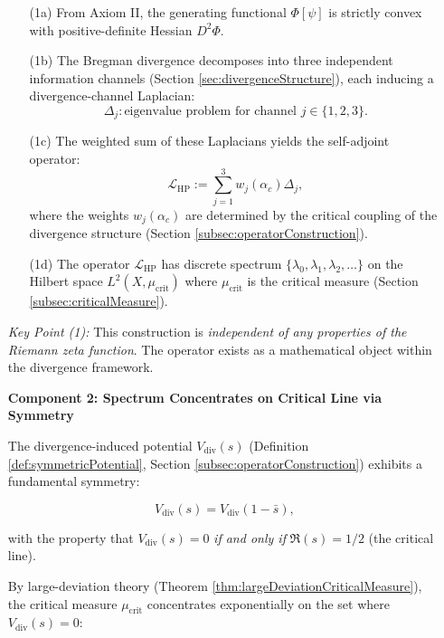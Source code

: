 \begin{theorem}
\begin{enumerate}
\begin{enumerate}
\item[(1a)] From Axiom II, the generating functional $\Phi[\psi]$ is strictly convex with positive-definite Hessian $D^2\Phi$.

\item[(1b)] The Bregman divergence decomposes into three independent information channels (Section \ref{sec:divergenceStructure}), each inducing a divergence-channel Laplacian:
\begin{equation}
\Delta_j : \text{eigenvalue problem for channel } j \in \{1,2,3\}.
\end{equation}

\item[(1c)] The weighted sum of these Laplacians yields the self-adjoint operator:
\begin{equation}
\mathcal{L}_{\mathrm{HP}} := \sum_{j=1}^{3} w_j(\alpha_c) \Delta_j,
\end{equation}
where the weights $w_j(\alpha_c)$ are determined by the critical coupling of the divergence structure (Section \ref{subsec:operatorConstruction}).

\item[(1d)] The operator $\mathcal{L}_{\mathrm{HP}}$ has discrete spectrum $\{\lambda_0, \lambda_1, \lambda_2, \ldots\}$ on the Hilbert space $L^2(X, \mu_{\mathrm{crit}})$ where $\mu_{\mathrm{crit}}$ is the critical measure (Section \ref{subsec:criticalMeasure}).

\end{enumerate}

\textit{Key Point (1):} This construction is \emph{independent of any properties of the Riemann zeta function}. The operator exists as a mathematical object within the divergence framework.

\item[\textbf{Component 2: Spectrum Concentrates on Critical Line via Symmetry}]

The divergence-induced potential $V_{\mathrm{div}}(s)$ (Definition \ref{def:symmetricPotential}, Section \ref{subsec:operatorConstruction}) exhibits a fundamental symmetry:

\begin{equation}
V_{\mathrm{div}}(s) = V_{\mathrm{div}}(1-\bar{s}),
\end{equation}

with the property that $V_{\mathrm{div}}(s) = 0$ \emph{if and only if} $\Re(s) = 1/2$ (the critical line).

By large-deviation theory (Theorem \ref{thm:largeDeviationCriticalMeasure}), the critical measure $\mu_{\mathrm{crit}}$ concentrates exponentially on the set where $V_{\mathrm{div}}(s) = 0$:


\end{enumerate}
\end{theorem}
